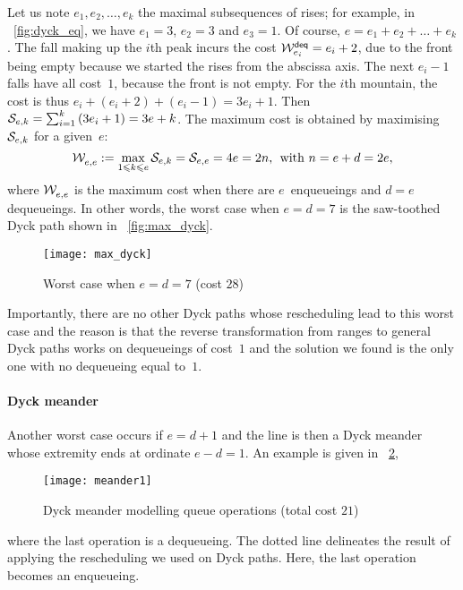 Let us note \(e_1, e_2, \dots, e_k\) the maximal subsequences of
rises; for example, in \fig~\ref{fig:dyck_eq}, we have \(e_1=3\),
\(e_2 = 3\) and \(e_3 = 1\). Of course, \(e = e_1 + e_2 + \dots +
e_k\). The fall making up the \(i\)th peak incurs the
cost \(\W{\fun{deq}}{e_i} = e_i + 2\),
due to the front being empty because we started the rises from the
abscissa axis. The next \(e_i-1\) falls have all cost~\(1\), because
the front is not empty. For the \(i\)th mountain, the cost is thus
\(e_i+(e_i+2)+(e_i-1) = 3e_i+1\). Then \(\A{e,k} =
\sum_{i=1}^{k}{(3e_i+1)} = 3e + k\). The maximum cost is obtained by
maximising \(\A{e,k}\) for a given~\(e\):
\begin{equation*}
\W{}{e,e} := \max_{1 \leqslant k \leqslant e}{\A{e,k}} = \A{e,e} = 4e
= 2n,\,\; \text{with \(n=e+d=2e\)},
\end{equation*}
where \(\W{}{e,e}\) is the maximum cost when there are
\(e\)~enqueueings and \({d=e}\) dequeueings. In other words, the worst
case when \(e=d=7\) is the saw\hyp{}toothed Dyck path shown in
\fig~\vref{fig:max_dyck}. 
\begin{figure}
\centering
\texttt{[image: max\_dyck]}
\caption{Worst case when \(e=d=7\) (cost \(28\))
\label{fig:max_dyck}}
\end{figure}
Importantly, there are no other Dyck paths whose rescheduling lead to
this worst case and the reason is that the reverse transformation from
ranges to general Dyck paths works on dequeueings of cost~\(1\) and
the solution we found is the only one with no dequeueing equal
to~\(1\).

\paragraph{Dyck meander}

Another worst case occurs if \(e = d + 1\) and the line is then a Dyck
meander whose extremity ends at ordinate \(e-d=1\). An example is
given in \fig~\ref{fig:meander1},
\begin{figure}[b]
\centering
\texttt{[image: meander1]}
\caption{Dyck meander modelling queue operations (total cost
  \(21\))\label{fig:meander1}}
\end{figure}
where the last operation is a dequeueing. The dotted line delineates
the result of applying the rescheduling we used on Dyck paths. Here,
the last operation becomes an enqueueing.

